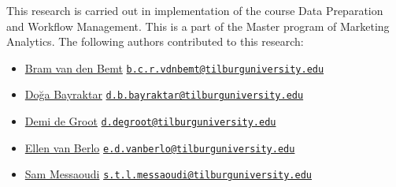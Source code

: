 \documentclass[
]{article}
\providecommand{\tightlist}{%
  \setlength{\itemsep}{0pt}\setlength{\parskip}{0pt}}
\begin{document}
This research is carried out in implementation of the course Data
Preparation and Workflow Management. This is a part of the Master
program of Marketing Analytics. The following authors contributed to
this research:

\begin{itemize}
\tightlist
\item
  \href{https://github.com/bramvdbemt}{Bram van den Bemt}
  \href{mailto:b.c.r.vdnbemt@tilburguniversity.edu}{\nolinkurl{b.c.r.vdnbemt@tilburguniversity.edu}}
\item
  \href{https://github.com/dogabayraktar}{Doğa Bayraktar}
  \href{mailto:d.b.bayraktar@tilburguniversity.edu}{\nolinkurl{d.b.bayraktar@tilburguniversity.edu}}
\item
  \href{https://github.com/Demidegroot}{Demi de Groot}
  \href{mailto:d.degroot@tilburguniversity.edu}{\nolinkurl{d.degroot@tilburguniversity.edu}}
\item
  \href{https://github.com/EllenB1}{Ellen van Berlo}
  \href{mailto:e.d.vanberlo@tilburguniversity.edu}{\nolinkurl{e.d.vanberlo@tilburguniversity.edu}}
\item
  \href{https://github.com/SamMes98}{Sam Messaoudi}
  \href{mailto:s.t.l.messaoudi@tilburguniversity.edu}{\nolinkurl{s.t.l.messaoudi@tilburguniversity.edu}}
\end{itemize}
\end{document}
